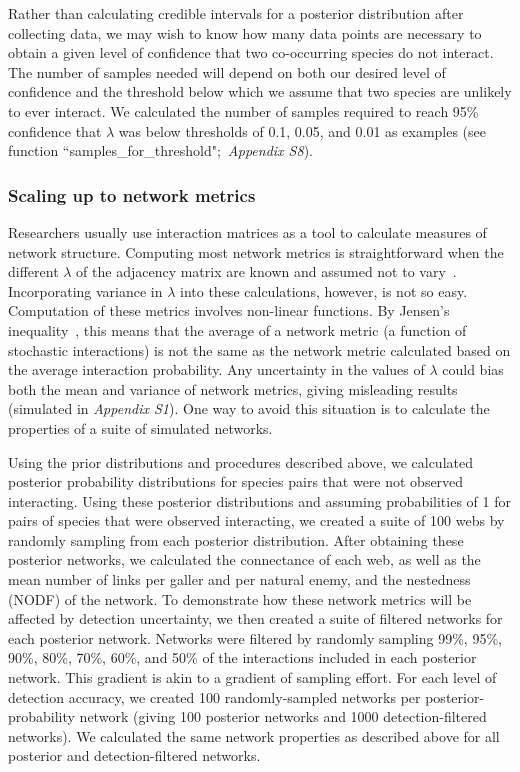 \documentclass[12pt]{article}
\begin{document}
\begin{spacing}{2.0}
        Rather than calculating credible intervals for a posterior distribution after collecting data, we may wish to know how many data points are necessary to obtain a given level of confidence that two co-occurring species do not interact. The number of samples needed will depend on both our desired level of confidence and the threshold below which we assume that two species are unlikely to ever interact. We calculated the number of samples required to reach 95\% confidence that $\lambda$ was below thresholds of 0.1, 0.05, and 0.01 as examples (see function ``samples\_for\_threshold";~\emph{Appendix S8}).


    \subsubsection*{Scaling up to network metrics}

      Researchers usually use interaction matrices as a tool to calculate measures of network structure. Computing most network metrics is straightforward when the different $\lambda$ of the adjacency matrix are known and assumed not to vary~\citep{Poisot2016}. Incorporating variance in $\lambda$ into these calculations, however, is not so easy. Computation of these metrics involves non-linear functions. By Jensen's inequality~\citep{Jensen1906}, this means that the average of a network metric (a function of stochastic interactions) is not the same as the network metric calculated based on the average interaction probability. Any uncertainty in the values of $\lambda$ could bias both the mean and variance of network metrics, giving misleading results (simulated in \emph{Appendix S1}). One way to avoid this situation is to calculate the properties of a suite of simulated networks.


      Using the prior distributions and procedures described above, we calculated posterior probability distributions for species pairs that were not observed interacting. Using these posterior distributions and assuming probabilities of 1 for pairs of species that were observed interacting, we created a suite of 100 webs by randomly sampling from each posterior distribution. After obtaining these posterior networks, we calculated the connectance of each web, as well as the mean number of links per galler and per natural enemy, and the nestedness (NODF) of the network. To demonstrate how these network metrics will be affected by detection uncertainty, we then created a suite of filtered networks for each posterior network. Networks were filtered by randomly sampling 99\%, 95\%, 90\%, 80\%, 70\%, 60\%, and 50\% of the interactions included in each posterior network. This gradient is akin to a gradient of sampling effort. For each level of detection accuracy, we created 100 randomly-sampled networks per posterior-probability network (giving 100 posterior networks and 1000 detection-filtered networks). We calculated the same network properties as described above for all posterior and detection-filtered networks.



\end{spacing}
\end{document}
